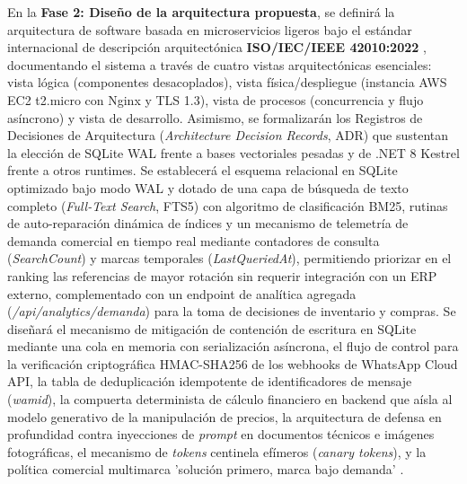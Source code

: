 En la \textbf{Fase 2: Diseño de la arquitectura propuesta}, se definirá la arquitectura de software basada en microservicios ligeros bajo el estándar internacional de descripción arquitectónica \textbf{ISO/IEC/IEEE 42010:2022} \parencite{iso42010}, documentando el sistema a través de cuatro vistas arquitectónicas esenciales: vista lógica (componentes desacoplados), vista física/despliegue (instancia AWS EC2 t2.micro con Nginx y TLS 1.3), vista de procesos (concurrencia y flujo asíncrono) y vista de desarrollo. Asimismo, se formalizarán los Registros de Decisiones de Arquitectura (\textit{Architecture Decision Records}, ADR) que sustentan la elección de SQLite WAL frente a bases vectoriales pesadas y de .NET 8 Kestrel frente a otros runtimes. Se establecerá el esquema relacional en SQLite optimizado bajo modo WAL y dotado de una capa de búsqueda de texto completo (\textit{Full-Text Search}, FTS5) con algoritmo de clasificación BM25, rutinas de auto-reparación dinámica de índices y un mecanismo de telemetría de demanda comercial en tiempo real mediante contadores de consulta (\textit{SearchCount}) y marcas temporales (\textit{LastQueriedAt}), permitiendo priorizar en el ranking las referencias de mayor rotación sin requerir integración con un ERP externo, complementado con un endpoint de analítica agregada (\textit{/api/analytics/demanda}) para la toma de decisiones de inventario y compras. Se diseñará el mecanismo de mitigación de contención de escritura en SQLite mediante una cola en memoria con serialización asíncrona, el flujo de control para la verificación criptográfica HMAC-SHA256 de los webhooks de WhatsApp Cloud API, la tabla de deduplicación idempotente de identificadores de mensaje (\textit{wamid}), la compuerta determinista de cálculo financiero en backend que aísla al modelo generativo de la manipulación de precios, la arquitectura de defensa en profundidad contra inyecciones de \textit{prompt} en documentos técnicos e imágenes fotográficas, el mecanismo de \textit{tokens} centinela efímeros (\textit{canary tokens}), y la política comercial multimarca 'solución primero, marca bajo demanda' \parencite{Zerega-Prado2022}.

